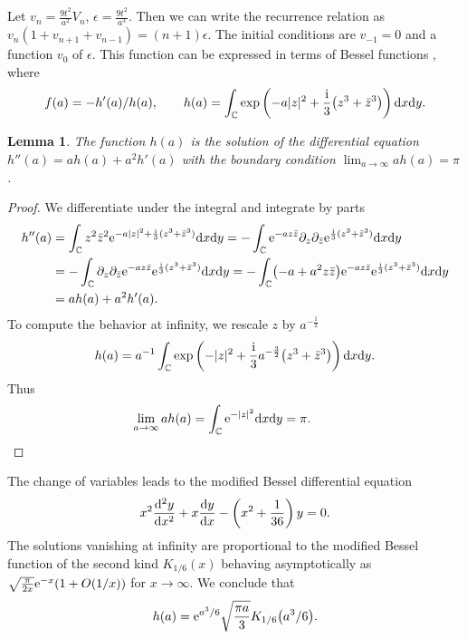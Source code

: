 \documentclass[10pt,a4paper]{amsart}
\numberwithin{equation}{section}
\newtheorem{Lemma}[Theorem]{Lemma}
\theoremstyle{definition}
\begin{document}
 Let
 $ v_n=\frac{9t^2}{a^2}V_n$, $ \epsilon = \frac{9t^2}{a^3}$.
 Then we can write the recurrence relation as $v_n(1+v_{n+1}+v_{n-1})=(n+1)\epsilon$.
The initial conditions are $v_{-1}=0$ and a function $v_0$ of $\epsilon$.
This function can be expressed in terms of Bessel functions
,
where
\[
f(a)=-h'(a)/h(a),\qquad h(a)=\int_{\mathbb C}\exp\left(-a|z|^2+\frac{\rm i}3\bigl(z^3+\bar z^3\bigr)\right){\rm d}x{\rm d}y.
\]
\begin{Lemma}\label{l-1}
The function $h(a)$ is the solution of the differential equation
$h''(a)=ah(a)+a^2h'(a)$
with the boundary condition $\lim_{a\to\infty}ah(a)=\pi$.
\end{Lemma}
\begin{proof}
 We differentiate under the integral and integrate by parts
 \begin{align*}
 h''(a)&=\int_{\mathbb C} z^2\bar z^2 {\rm e}^{-a|z|^2+\frac{\rm i}3(z^3+\bar z^3)}{\rm d}x{\rm d}y
 =-\int_{\mathbb C} {\rm e}^{-az\bar z}\partial_z\partial_{\bar z}{\rm e}^{\frac{\rm i}3(z^3+\bar z^3)}{\rm d}x{\rm d}y
 \\
 &=-\int_{\mathbb C}\partial_z \partial_{\bar z}{\rm e}^{-az\bar z}{\rm e}^{\frac{\rm i}3(z^3+\bar z^3)}{\rm d}x{\rm d}y
 =-\int_{\mathbb C}\bigl(-a+a^2z\bar z\bigr){\rm e}^{-az\bar z}{\rm e}^{\frac{\rm i}3(z^3+\bar z^3)}{\rm d}x{\rm d}y
 \\
 &=ah(a)+a^2h'(a).
 \end{align*}
 To compute the behavior at infinity, we rescale $z$ by $a^{-\frac12}$
 \[
 h(a)=a^{-1}\int_{\mathbb C} \exp\left({-|z|^2+\frac{\rm i}3a^{-\frac32}}\bigl(z^3+\bar z^3\bigr)\right){\rm d}x{\rm d}y.
 \]
 Thus
 \[
 \lim_{a\to\infty}ah(a)=\int_{\mathbb C} {\rm e}^{-|z|^2}{\rm d}x{\rm d}y=\pi.\tag*{\qed}
\]
 \renewcommand{\qed}{}
\end{proof}

The change of variables
 leads to the modified Bessel differential equation
\[
x^2\frac{{\rm d}^2y}{{\rm d}x^2}+x\frac{{\rm d}y}{{\rm d}x}-\left(x^2+\frac1{36}\right)y=0.
\]
The solutions vanishing at infinity are proportional to the modified Bessel function of the second kind $K_{1/6}(x)$ behaving asymptotically as $\sqrt{\frac\pi{2x}}{\rm e}^{-x}(1+O(1/x))$ for $x\to\infty$. We conclude that
\begin{equation}\label{e-K}
h(a)={\rm e}^{a^3/6}\sqrt{\frac{\pi a}3}K_{1/6}\bigl(a^3/6\bigr).
\end{equation}
\end{document}
